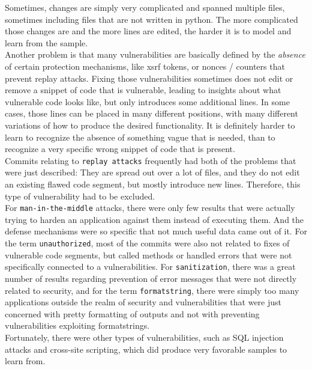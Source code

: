 \documentclass[
a4paper,
pagesize,
pdftex,
12pt,
twoside, %
BCOR=5mm, %
ngerman,
fleqn,
final,
]{scrartcl}
\begin{document}
	Sometimes, changes are simply very complicated and spanned multiple files, sometimes including files that are not written in python. The more complicated those changes are and the more lines are edited, the harder it is to model and learn from the sample.\\
	Another problem is that many vulnerabilities are basically defined by the \textit{absence} of certain protection mechanisms, like xsrf tokens, or nonces / counters that prevent replay attacks. Fixing those vulnerabilities sometimes does not edit or remove a snippet of code that is vulnerable, leading to insights about what vulnerable code looks like, but only introduces some additional lines. In some cases, those lines can be placed in many different positions, with many different variations of how to produce the desired functionality. It is definitely harder to learn to recognize the absence of something vague that is needed, than to recognize a very specific wrong snippet of code that is present.\\
	Commits relating to \texttt{replay attacks} frequently had both of the problems that were just described: They are spread out over a lot of files, and they do not edit an existing flawed code segment, but mostly introduce new lines. Therefore, this type of vulnerability had to be excluded.\\	
	For \texttt{man-in-the-middle} attacks, there were only few results that were actually trying to harden an application against them instead of executing them. And the defense mechanisms were so specific that not much useful data came out of it. For the term \texttt{unauthorized}, most of the commits were also not related to fixes of vulnerable code segments, but called methods or handled errors that were not specifically connected to a vulnerabilities. For \texttt{sanitization}, there was a great number of results regarding prevention of error messages that were not directly related to security, and for the term \texttt{formatstring}, there were simply too many applications outside the realm of security and vulnerabilities that were just concerned with pretty formatting of outputs and not with preventing vulnerabilities exploiting formatstrings.\\
	Fortunately, there were other types of vulnerabilities, such as SQL injection attacks and cross-site scripting, which did produce very favorable samples to learn from.
	
\end{document}
